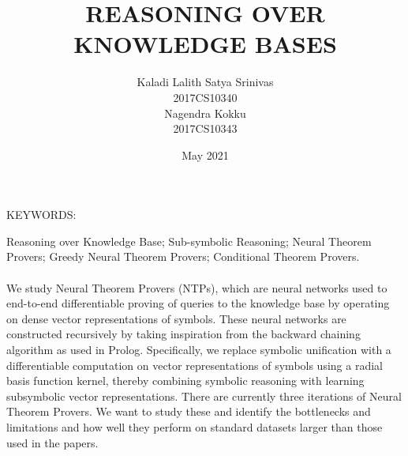 \documentclass[Other]{iitddiss}
\begin{document}

\title{REASONING OVER KNOWLEDGE BASES}

\author{Kaladi Lalith Satya Srinivas \\2017CS10340\\ Nagendra Kokku \\2017CS10343}
\date{May 2021}

\maketitle



\abstract

\noindent KEYWORDS: \hspace*{0.5em} \parbox[t]{4.4in}{Reasoning over Knowledge Base; Sub-symbolic Reasoning; Neural Theorem Provers; Greedy Neural Theorem Provers; Conditional Theorem Provers.}

\paragraph{}
We study Neural Theorem Provers (NTPs), which are neural networks used to end-to-end differentiable proving of queries to the knowledge base by operating on dense vector representations of symbols. These neural networks are constructed recursively by taking inspiration from the backward chaining algorithm as used in Prolog. Specifically, we replace symbolic unification with a differentiable computation on vector representations of symbols using a radial basis function kernel, thereby combining symbolic reasoning with learning subsymbolic vector representations. There are currently three iterations of Neural Theorem Provers. We want to study these and identify the bottlenecks and limitations and how well they perform on standard datasets larger than those used in the papers.

\vspace*{24pt}

\noindent 

\pagebreak


\begin{singlespace}
\tableofcontents
\thispagestyle{empty}
\end{singlespace}
\end{document}
